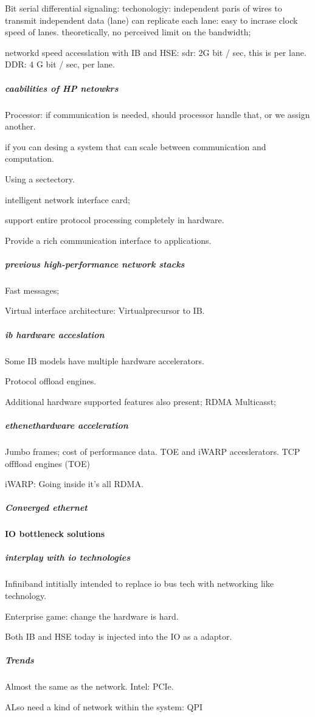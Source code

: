 \documentclass[12pt]{article}
\begin{document}
Bit serial differential signaling: techonologiy: independent paris of wires to transmit independent data (lane)
can replicate each lane: easy to incrase clock speed of lanes.
theoretically, no perceived limit on the bandwidth;


networkd speed accesslation with IB and HSE:
sdr: 2G bit / sec, this  is per lane.
DDR: 4 G bit / sec, per lane.

\subparagraph{caabilities of HP netowkrs}
Processor: if communication is needed, should processor handle that, or we assign another.

if you can desing a system that can scale between communication and computation.

Using a sectectory.


intelligent network interface card;

support entire protocol processing completely in hardware.

Provide a rich communication interface to applications.

\subparagraph{previous high-performance network stacks}
Fast messages;

Virtual interface architecture: Virtualprecursor to IB.

\subparagraph{ib hardware acceslation}
Some IB models have multiple hardware accelerators.

Protocol offload engines.

Additional hardware supported features also present; RDMA Multicasst;

\subparagraph{ethenethardware acceleration}
Jumbo frames;
cost of performance data.
TOE and iWARP acceslerators.
TCP offfload engines (TOE)

iWARP:
Going inside it's all RDMA. 

\subparagraph{Converged ethernet}

\paragraph{IO bottleneck solutions}
\subparagraph{interplay with io technologies}
Infiniband intitially intended to replace io bus tech with networking like technology.

Enterprise game: change the hardware is hard.

Both IB and HSE today is injected into the IO as a adaptor.
\subparagraph{Trends} Almost the same as the network.
Intel: PCIe. 

ALso need a kind of network within the system: QPI
\end{document}
